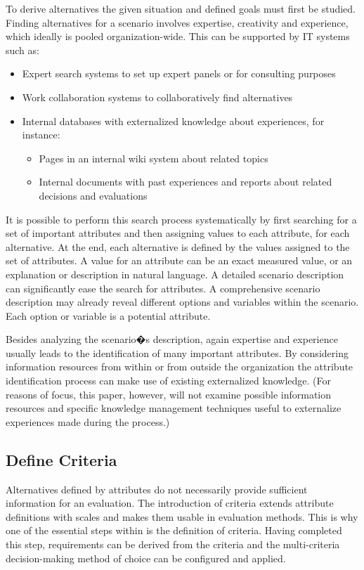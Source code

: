 \documentclass[journal,final,a4paper,twoside]{IEEEtran}
\begin{document}
To derive alternatives the given situation and defined goals must first be studied. Finding alternatives for a scenario involves expertise, creativity and experience, which ideally is pooled organization-wide. This can be supported by IT systems such as:
\begin{itemize}
\item Expert search systems to set up expert panels or for consulting purposes
\item Work collaboration systems to collaboratively find alternatives
\item Internal databases with externalized knowledge about experiences, for instance:
	\begin{itemize}
	\item Pages in an internal wiki system about related topics
	\item Internal documents with past experiences and reports about related decisions and evaluations
	\end{itemize}
\end{itemize}
It is possible to perform this search process systematically by first searching for a set of important attributes and then assigning values to each attribute, for each alternative. At the end, each alternative is defined by the values assigned to the set of attributes. A value for an attribute can be an exact measured value, or an explanation or description in natural language. 
A detailed scenario description can significantly ease the search for attributes. A comprehensive scenario description may already reveal different options and variables within the scenario. Each option or variable is a potential attribute. 

Besides analyzing the scenario�s description, again expertise and experience usually leads to the identification of many important attributes. By considering information resources from within or from outside the organization the attribute identification process can make use of existing externalized knowledge. (For reasons of focus, this paper, however, will not examine possible information resources and specific knowledge management techniques useful to externalize experiences made during the process.)



\subsection{Define Criteria}
Alternatives defined by attributes do not necessarily provide sufficient information for an evaluation. The introduction of criteria extends attribute definitions with scales and makes them usable in evaluation methods. This is why one of the essential steps within  is the definition of criteria. Having completed this step, requirements can be derived from the criteria and the multi-criteria decision-making method of choice can be configured and applied.
\end{document}
